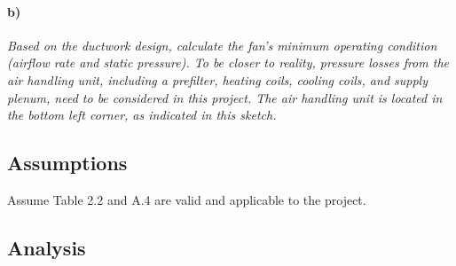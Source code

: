 \newpage
\setcounter{subsection}{0}
\paragraph{b)} \textit{Based on the ductwork design, calculate the fan's minimum operating condition (airflow rate and static pressure). To be closer to reality, pressure losses from the air handling unit, including a prefilter, heating coils, cooling coils, and supply plenum, need to be considered in this project. The air handling unit is located in the bottom left corner, as indicated in this sketch.}\\
\subsection{Assumptions}
Assume Table 2.2 and A.4 are valid and applicable to the project.
\subsection{Analysis}
